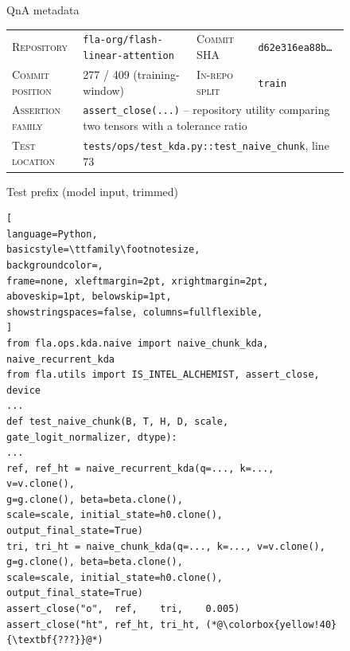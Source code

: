 \documentclass{llmxive}
\begin{document}
\begin{figure}[!htbp]
\begin{center}
\begin{tcolorbox}[
enhanced,
colback=white, colframe=qexHead, coltitle=white,
fonttitle=\bfseries,
title={Detailed qualitative example: \texttt{fla-org/flash-linear-attention} (IR test, commit-derived)},
arc=3pt, boxrule=0.6pt,
top=3pt, bottom=3pt, left=6pt, right=6pt,
]

\begin{qexsection}{QnA metadata}
\footnotesize
\begin{tabular}{@{}l@{\;\;}l@{\hskip 14pt}l@{\;\;}l@{}}
\textsc{Repository}      & \texttt{fla-org/flash-linear-attention}     & \textsc{Commit SHA}        & \texttt{d62e316ea88b\ldots} \\
\textsc{Commit position} & 277 / 409 (training-window)                 & \textsc{In-repo split}     & \texttt{train} \\
\textsc{Assertion family} & \multicolumn{3}{l}{\texttt{assert\_close(...)} -- repository utility comparing two tensors with a tolerance ratio} \\
\textsc{Test location}   & \multicolumn{3}{l}{\texttt{tests/ops/test\_kda.py::test\_naive\_chunk}, line 73} \\
\end{tabular}
\end{qexsection}

\begin{qexsection}{Test prefix (model input, trimmed)}
\begin{lstlisting}[
language=Python,
basicstyle=\ttfamily\footnotesize,
backgroundcolor=,
frame=none, xleftmargin=2pt, xrightmargin=2pt,
aboveskip=1pt, belowskip=1pt,
showstringspaces=false, columns=fullflexible,
]
from fla.ops.kda.naive import naive_chunk_kda, naive_recurrent_kda
from fla.utils import IS_INTEL_ALCHEMIST, assert_close, device
...
def test_naive_chunk(B, T, H, D, scale, gate_logit_normalizer, dtype):
...
ref, ref_ht = naive_recurrent_kda(q=..., k=..., v=v.clone(),
g=g.clone(), beta=beta.clone(),
scale=scale, initial_state=h0.clone(),
output_final_state=True)
tri, tri_ht = naive_chunk_kda(q=..., k=..., v=v.clone(),
g=g.clone(), beta=beta.clone(),
scale=scale, initial_state=h0.clone(),
output_final_state=True)
assert_close("o",  ref,    tri,    0.005)
assert_close("ht", ref_ht, tri_ht, (*@\colorbox{yellow!40}{\textbf{???}}@*)
\end{lstlisting}
\end{qexsection}


\end{tcolorbox}
\end{center}
\end{figure}
\end{document}
